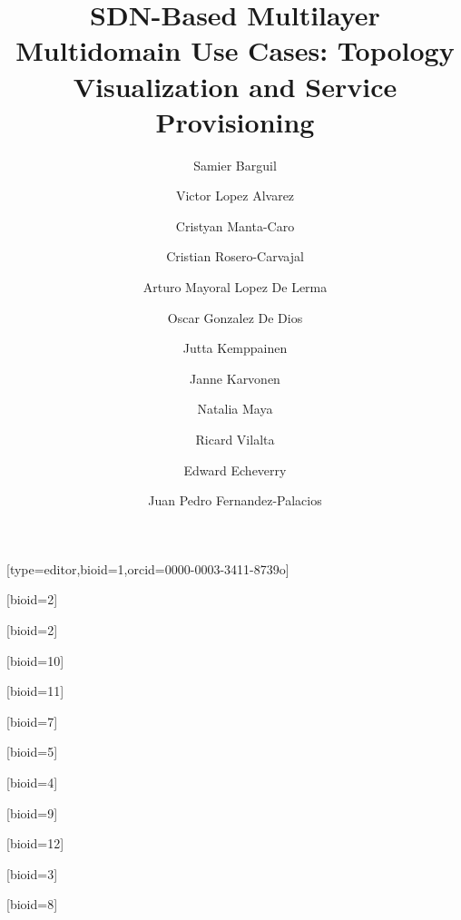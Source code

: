 \documentclass[a4paper,fleqn]{cas-dc}
\begin{document}
\let\WriteBookmarks\relax
\def\floatpagepagefraction{1}
\def\textpagefraction{.001}

\title [mode = title]{SDN-Based Multilayer Multidomain Use Cases: Topology Visualization and Service Provisioning}                      



\author[1,4]{Samier Barguil}[type=editor,bioid=1,orcid=0000-0003-3411-8739o]
\cormark[1]

\author[2]{Victor Lopez Alvarez}[bioid=2]

\author[4]{Cristyan Manta-Caro}[bioid=2]

\author[4]{Cristian Rosero-Carvajal}[bioid=10]

\author[2]{Arturo Mayoral Lopez De Lerma}[bioid=11]

\author[2]{Oscar Gonzalez De Dios}[bioid=7]

\author[5]{Jutta Kemppainen}[bioid=5]

\author[5]{Janne Karvonen}[bioid=4]

\author[5]{Natalia Maya}[bioid=9]

\author[6]{Ricard Vilalta}[bioid=12]

\author[3]{Edward Echeverry}[bioid=3]

\author[2]{Juan Pedro Fernandez-Palacios}[bioid=8]

\address[1]{Universidad Autonoma de Madrid, Madrid, Spain}
\address[2]{Telefonica I+D, Ronda de la Comunicacion, Madrid, Spain}
\address[3]{Telefonica Movistar, Transversal 60 No 114ª -55. Bogotá, Colombia}
\address[4]{Wipro Technologies Ltd., Doddakannelli, Sarjapur Road
Bengaluru - 560 035, India}
\address[5]{Infinera Corporation, 140 Caspian Court, Sunnyvale, CA 94089, USA}
\address[6]{Centre Tecnològic de Telecomunicacions de Catalunya, Castelldefels, Barcelona}
\end{document}
